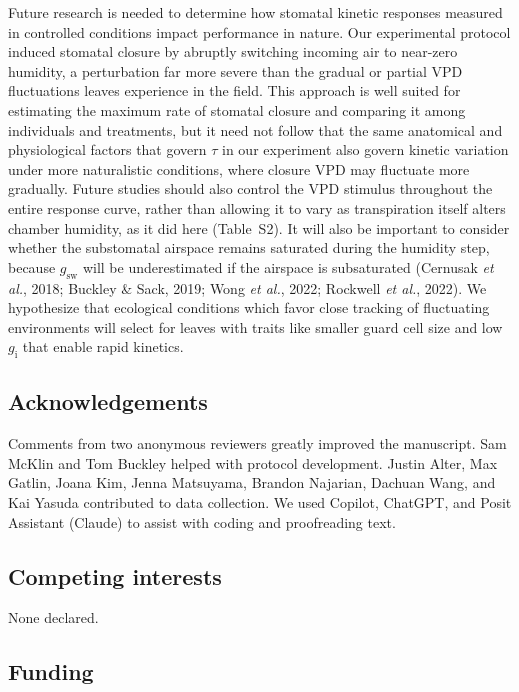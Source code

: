 \documentclass[
  letterpaper,
  DIV=11,
  numbers=noendperiod]{scrartcl}
\newcommand{\gi}{$g_\mathrm{i}$}
\newcommand{\gsw}{$g_\mathrm{sw}$}
\begin{document}
Future research is needed to determine how stomatal kinetic responses
measured in controlled conditions impact performance in nature. Our
experimental protocol induced stomatal closure by abruptly switching
incoming air to near-zero humidity, a perturbation far more severe than
the gradual or partial VPD fluctuations leaves experience in the field.
This approach is well suited for estimating the maximum rate of stomatal
closure and comparing it among individuals and treatments, but it need
not follow that the same anatomical and physiological factors that
govern \(\tau\) in our experiment also govern kinetic variation under
more naturalistic conditions, where closure VPD may fluctuate more
gradually. Future studies should also control the VPD stimulus
throughout the entire response curve, rather than allowing it to vary as
transpiration itself alters chamber humidity, as it did here
(Table~S2). It will also be important to consider whether the
substomatal airspace remains saturated during the humidity step, because
\gsw{} will be underestimated if the airspace is subsaturated (Cernusak
\emph{et al.}, 2018; Buckley \& Sack, 2019; Wong \emph{et al.}, 2022;
Rockwell \emph{et al.}, 2022). We hypothesize that ecological conditions
which favor close tracking of fluctuating environments will select for
leaves with traits like smaller guard cell size and low \gi{} that
enable rapid kinetics.

\subsection{Acknowledgements}\label{acknowledgements}

Comments from two anonymous reviewers greatly improved the manuscript.
Sam McKlin and Tom Buckley helped with protocol development. Justin
Alter, Max Gatlin, Joana Kim, Jenna Matsuyama, Brandon Najarian, Dachuan
Wang, and Kai Yasuda contributed to data collection. We used Copilot,
ChatGPT, and Posit Assistant (Claude) to assist with coding and
proofreading text.

\subsection{Competing interests}\label{competing-interests}

None declared.

\subsection{Funding}\label{funding}
\end{document}

